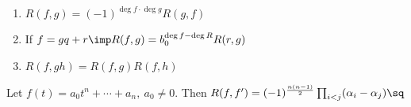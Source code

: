 \documentclass[a4paper]{article}
\begin{document}
\begin{tcorollary}
  \begin{enumerate}
    \item \( R(f,g) = (-1)^{\deg f \cdot \deg g}R(g,f) \)
    \item If \( f = gq + r \imp R(f,g) = b_0^{\deg f - \deg R} R(r,g) \)
    \item \( R(f,gh) = R(f,g)R(f,h) \)
  \end{enumerate}
\end{tcorollary}

\begin{tcorollary}
  Let \( f(t) = a_0 t^{n} + \cdots + a_n,\ a_0\neq 0 \).
  Then \( R(f,f') = (-1)^{\frac{n(n-1)}{2}}\prod_{i<j}(\alpha_i-\alpha_j)\sq \)
\end{tcorollary}
\end{document}
